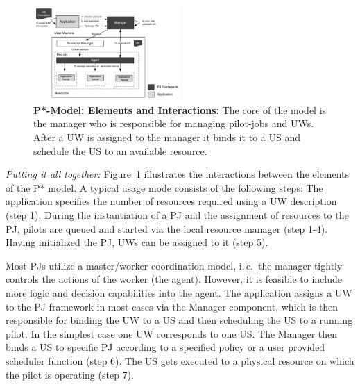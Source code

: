 \documentclass[conference,final]{IEEEtran}
\newcommand{\jhanote}[1]{ {\textcolor{red} { ***shantenu: #1 }}}
\newcommand{\jhanote}[1]{}
\newcommand{\upp}{\vspace*{-0.5em}}
\begin{document}

 

\begin{figure}[htbp]
    \centering    
    \includegraphics[width=0.5\textwidth]{figures/pstar_model.pdf}
    \caption{\textbf{P*-Model: Elements and Interactions:} The core of the model 
is the manager who is responsible for managing pilot-jobs and UWs. After a UW is 
assigned to the manager it binds it to a US and schedule the US to an available 
resource. \upp\upp}
    \label{fig:figures_pstar}
\end{figure}

{\it Putting it all together:} Figure~\ref{fig:figures_pstar}
illustrates the interactions between the elements of the P* model. A
typical usage mode consists of the following steps: The application
specifies the number of resources required using a UW description
(step 1). During the instantiation of a PJ and the assignment of
resources to the PJ, pilots are queued and started via the local
resource manager (step 1-4). Having initialized the PJ, UWs can be
assigned to it (step 5).


Most PJs utilize a master/worker coordination model, i.\,e.\ the
manager tightly controls the actions of the worker (the
agent). However, it is feasible to include more logic and decision
capabilities into the agent. The application assigns a UW
to the PJ framework in most cases via the Manager component, which is
then responsible for binding the UW to a US and then scheduling the US 
to a running pilot.  In
the simplest case one UW corresponds to one US. The Manager then binds
a US to specific PJ according to a specified policy or a user provided
scheduler function (step 6). The US gets executed to a physical
resource on which the pilot is operating (step 7).
\end{document}
